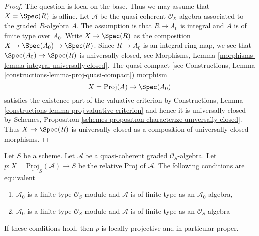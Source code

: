 \begin{proof}
The question is local on the base. Thus we may assume that $X = \Spec(R)$
is affine. Let $\mathcal{A}$ be the quasi-coherent $\mathcal{O}_X$-algebra
associated to the graded $R$-algebra $A$. The assumption is that $R \to A_0$
is integral and $A$ is of finite type over $A_0$.
Write $X \to \Spec(R)$ as the composition $X \to \Spec(A_0) \to \Spec(R)$.
Since $R \to A_0$ is an integral ring map, we see that
$\Spec(A_0) \to \Spec(R)$ is universally closed, see
Morphisms, Lemma \ref{morphisms-lemma-integral-universally-closed}.
The quasi-compact (see
Constructions, Lemma \ref{constructions-lemma-proj-quasi-compact}) morphism
$$
X = \text{Proj}(A) \to \Spec(A_0)
$$
satisfies the existence part of the valuative criterion by
Constructions, Lemma \ref{constructions-lemma-proj-valuative-criterion}
and hence it is universally closed by
Schemes, Proposition \ref{schemes-proposition-characterize-universally-closed}.
Thus $X \to \Spec(R)$ is universally closed as a composition of
universally closed morphisms.
\end{proof}

\begin{lemma}
\label{lemma-relative-proj-proper}
Let $S$ be a scheme. Let $\mathcal{A}$ be a quasi-coherent graded
$\mathcal{O}_S$-algebra. Let
$p : X = \underline{\text{Proj}}_S(\mathcal{A}) \to S$ be the relative
Proj of $\mathcal{A}$. The following conditions are equivalent
\begin{enumerate}
\item $\mathcal{A}_0$ is a finite type $\mathcal{O}_S$-module
and $\mathcal{A}$ is of finite type as an $\mathcal{A}_0$-algebra,
\item $\mathcal{A}_0$ is a finite type $\mathcal{O}_S$-module 
and $\mathcal{A}$ is of finite type as an $\mathcal{O}_S$-algebra
\end{enumerate}
If these conditions hold, then $p$ is locally projective and in
particular proper.
\end{lemma}

